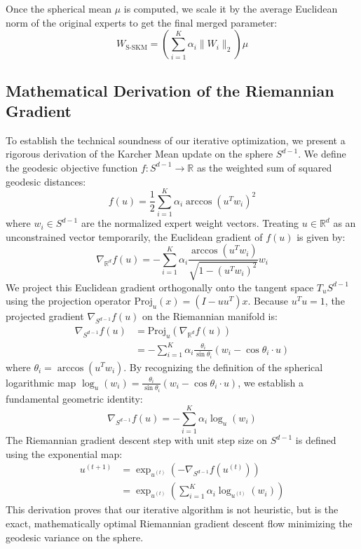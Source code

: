 \documentclass{article}
\begin{document}
Once the spherical mean $\mu$ is computed, we scale it by the average Euclidean norm of the original experts to get the final merged parameter:
\begin{equation}
  W_{\text{S-SKM}} = \left( \sum_{i=1}^K \alpha_i \|W_i\|_2 \right) \mu
\end{equation}

\subsection{Mathematical Derivation of the Riemannian Gradient}
To establish the technical soundness of our iterative optimization, we present a rigorous derivation of the Karcher Mean update on the sphere $S^{d-1}$. We define the geodesic objective function $f: S^{d-1} \to \mathbb{R}$ as the weighted sum of squared geodesic distances:
\begin{equation}
  f(u) = \frac{1}{2} \sum_{i=1}^K \alpha_i \arccos(u^T w_i)^2
\end{equation}
where $w_i \in S^{d-1}$ are the normalized expert weight vectors. Treating $u \in \mathbb{R}^d$ as an unconstrained vector temporarily, the Euclidean gradient of $f(u)$ is given by:
\begin{equation}
  \nabla_{\mathbb{R}^d} f(u) = - \sum_{i=1}^K \alpha_i \frac{\arccos(u^T w_i)}{\sqrt{1 - (u^T w_i)^2}} w_i
\end{equation}
We project this Euclidean gradient orthogonally onto the tangent space $T_u S^{d-1}$ using the projection operator $\text{Proj}_u(x) = (I - u u^T) x$. Because $u^T u = 1$, the projected gradient $\nabla_{S^{d-1}} f(u)$ on the Riemannian manifold is:
\begin{equation}
\begin{split}
  \nabla_{S^{d-1}} f(u) &= \text{Proj}_u \left( \nabla_{\mathbb{R}^d} f(u) \right) \\
  &= - \sum_{i=1}^K \alpha_i \frac{\theta_i}{\sin\theta_i} (w_i - \cos\theta_i \cdot u)
\end{split}
\end{equation}
where $\theta_i = \arccos(u^T w_i)$. By recognizing the definition of the spherical logarithmic map $\log_u(w_i) = \frac{\theta_i}{\sin\theta_i} (w_i - \cos\theta_i \cdot u)$, we establish a fundamental geometric identity:
\begin{equation}
  \nabla_{S^{d-1}} f(u) = - \sum_{i=1}^K \alpha_i \log_u(w_i)
\end{equation}
The Riemannian gradient descent step with unit step size on $S^{d-1}$ is defined using the exponential map:
\begin{equation}
\begin{split}
  u^{(t+1)} &= \exp_{u^{(t)}} \left( -\nabla_{S^{d-1}} f(u^{(t)}) \right) \\
  &= \exp_{u^{(t)}} \left( \sum_{i=1}^K \alpha_i \log_{u^{(t)}}(w_i) \right)
\end{split}
\end{equation}
This derivation proves that our iterative algorithm is not heuristic, but is the exact, mathematically optimal Riemannian gradient descent flow minimizing the geodesic variance on the sphere.
\end{document}
